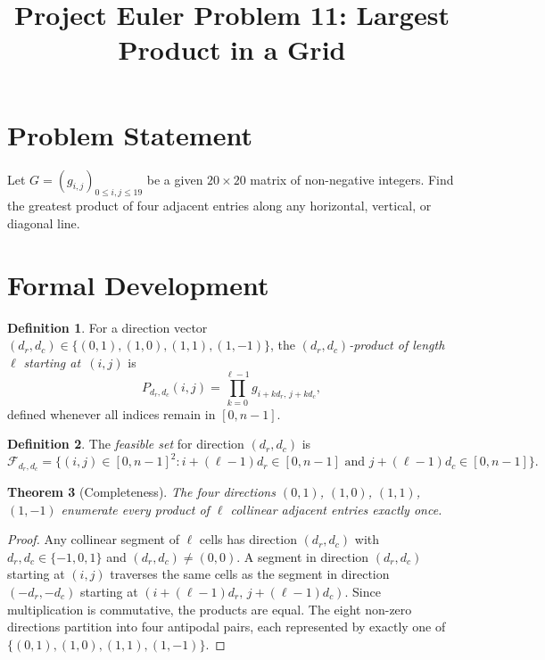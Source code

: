 \documentclass[12pt]{article}
\title{Project Euler Problem 11: Largest Product in a Grid}
\author{}
\date{}
\newtheorem{theorem}{Theorem}
\theoremstyle{definition}
\newtheorem{definition}[theorem]{Definition}
\begin{document}
\maketitle

\section{Problem Statement}

Let $G = (g_{i,j})_{0 \le i,j \le 19}$ be a given $20 \times 20$ matrix of non-negative integers. Find the greatest product of four adjacent entries along any horizontal, vertical, or diagonal line.

\section{Formal Development}

\begin{definition}
For a direction vector $(d_r, d_c) \in \{(0,1),(1,0),(1,1),(1,-1)\}$, the \emph{$(d_r,d_c)$-product of length~$\ell$ starting at~$(i,j)$} is
\[
P_{d_r,d_c}(i,j) = \prod_{k=0}^{\ell-1} g_{i + k d_r,\, j + k d_c},
\]
defined whenever all indices remain in $[0, n-1]$.
\end{definition}

\begin{definition}
The \emph{feasible set} for direction $(d_r,d_c)$ is
\[
\mathcal{F}_{d_r,d_c} = \bigl\{(i,j) \in [0,n-1]^2 : i+(\ell-1)d_r \in [0,n-1] \text{ and } j+(\ell-1)d_c \in [0,n-1]\bigr\}.
\]
\end{definition}

\begin{theorem}[Completeness]
The four directions $(0,1)$, $(1,0)$, $(1,1)$, $(1,-1)$ enumerate every product of $\ell$ collinear adjacent entries exactly once.
\end{theorem}

\begin{proof}
Any collinear segment of $\ell$ cells has direction $(d_r,d_c)$ with $d_r,d_c \in \{-1,0,1\}$ and $(d_r,d_c) \neq (0,0)$. A segment in direction $(d_r,d_c)$ starting at $(i,j)$ traverses the same cells as the segment in direction $(-d_r,-d_c)$ starting at $(i+(\ell-1)d_r,\, j+(\ell-1)d_c)$. Since multiplication is commutative, the products are equal. The eight non-zero directions partition into four antipodal pairs, each represented by exactly one of $\{(0,1),(1,0),(1,1),(1,-1)\}$.
\end{proof}
\end{document}
